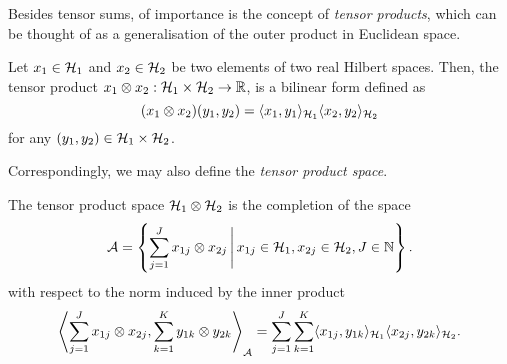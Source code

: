 
Besides tensor sums, of importance is the concept of \emph{tensor products}, which can be thought of as a generalisation of the outer product in Euclidean space.

\begin{definition}
  Let $x_1\in{\mathcal H}_1$ and $x_2\in{\mathcal H}_2$ be two elements of two real Hilbert spaces.
  Then, the tensor product $x_1 \otimes x_2:{\mathcal H}_1\times{\mathcal H}_2\to\mathbb{R}$, is a bilinear form defined as
  \[
    (x_1\otimes x_2)(y_1,y_2) = \langle x_1,y_1\rangle_{{\mathcal H}_1}\langle x_2,y_2\rangle_{{\mathcal H}_2}
  \]
  for any $(y_1,y_2)\in{\mathcal H}_1\times{\mathcal H}_2$.
\end{definition}

Correspondingly, we may also define the \emph{tensor product space}.

\begin{definition}\label{def:tensprodspace}
  The tensor product space ${\mathcal H}_1\otimes{\mathcal H}_2$ is the completion of the space
  \[
    {\mathcal A} = \left\{ \sum_{j=1}^J x_{1j} \otimes x_{2j} \,\Bigg\vert\, x_{1j}\in{\mathcal H}_1, x_{2j}\in{\mathcal H}_2, J \in \mathbb{N} \right\}.
  \]
  with respect to the norm induced by the inner product
  \[
    \left\langle  \sum_{j=1}^J x_{1j} \otimes x_{2j},  \sum_{k=1}^K y_{1k} \otimes y_{2k} \right\rangle_{\mathcal A} = \sum_{j=1}^J\sum_{k=1}^K \langle x_{1j},y_{1k}\rangle_{{\mathcal H}_1} \langle x_{2j},y_{2k}\rangle_{{\mathcal H}_2}.
  \]
\end{definition}

